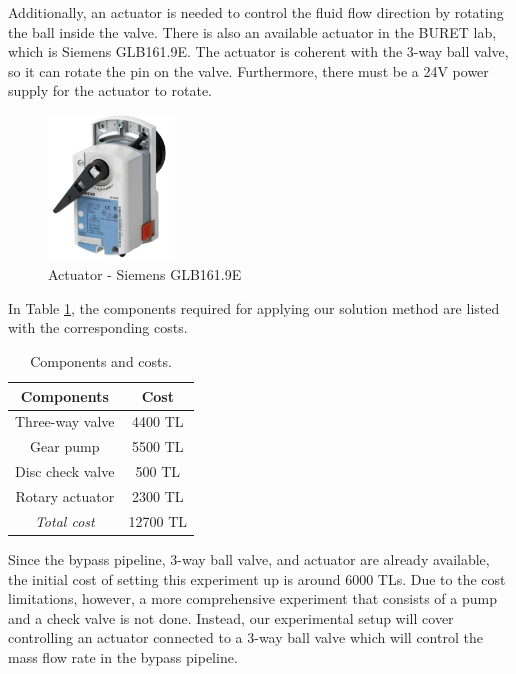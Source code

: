 Additionally, an actuator is needed to control the fluid flow direction by rotating the ball inside the valve. There is also an available actuator in the BURET lab, which is Siemens GLB161.9E. The actuator is coherent with the 3-way ball valve, so it can rotate the pin on the valve. Furthermore, there must be a 24V power supply for the actuator to rotate.

\begin{figure}[H]
		\centering
		\includegraphics[width=0.3\textwidth]{images/actuator.jpeg}
		\caption[Actuator - Siemens GLB161.9E]{Actuator - Siemens GLB161.9E}
		\label{actuator} 
\end{figure} 

\par
In Table \ref{tab:components}, the components required for applying our solution method are listed with the corresponding costs.

\begin{table}[h]
    \centering
    \begin{tabular}{|c|c|}
         \hline 
         \textbf{Components}    & \textbf{Cost}  \\
         \hline
         Three-way valve        &  4400 TL         \\
         Gear pump              &  5500 TL         \\
         Disc check valve       &  500  TL         \\
         Rotary actuator        &  2300 TL         \\
         \hline
         \textit{Total cost}    &  12700 TL         \\
         \hline
    \end{tabular}
    \caption{Components and costs.}
    \label{tab:components}
\end{table}

Since the bypass pipeline, 3-way ball valve, and actuator are already available, the initial cost of setting this experiment up is around 6000 TLs. Due to the cost limitations, however, a more comprehensive experiment that consists of a pump and a check valve is not done. Instead, our experimental setup will cover controlling an actuator connected to a 3-way ball valve which will control the mass flow rate in the bypass pipeline.

